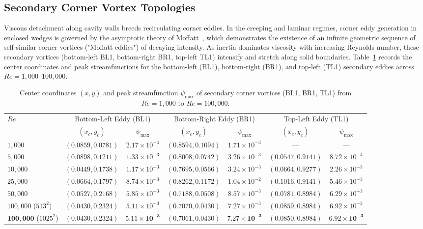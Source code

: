 \documentclass[11pt,a4paper]{article}
\begin{document}
\subsection{Secondary Corner Vortex Topologies}
Viscous detachment along cavity walls breeds recirculating corner eddies. In the creeping and laminar regimes, corner eddy generation in enclosed wedges is governed by the asymptotic theory of Moffatt~\cite{moffatt1964viscous}, which demonstrates the existence of an infinite geometric sequence of self-similar corner vortices ("Moffatt eddies") of decaying intensity. As inertia dominates viscosity with increasing Reynolds number, these secondary vortices (bottom-left BL1, bottom-right BR1, top-left TL1) intensify and stretch along solid boundaries. Table~\ref{tab:corner_vortices} records the center coordinates and peak streamfunctions for the bottom-left (BL1), bottom-right (BR1), and top-left (TL1) secondary eddies across $Re = 1{,}000\text{--}100{,}000$.

\begin{table}[htbp]
\centering
\scriptsize
\setlength{\tabcolsep}{2.5pt}
\caption{Center coordinates $(x, y)$ and peak streamfunction $\psi_{\max}$ of secondary corner vortices (BL1, BR1, TL1) from $Re = 1,000$ to $Re = 100,000$.}
\label{tab:corner_vortices}
\begin{tabular*}{\textwidth}{@{\extracolsep{\fill}}lcccccc@{}}
\toprule
$Re$ & \multicolumn{2}{c}{Bottom-Left Eddy (BL1)} & \multicolumn{2}{c}{Bottom-Right Eddy (BR1)} & \multicolumn{2}{c}{Top-Left Eddy (TL1)} \\
\cmidrule(lr){2-3} \cmidrule(lr){4-5} \cmidrule(lr){6-7}
 & $(x_c, y_c)$ & $\psi_{\max}$ & $(x_c, y_c)$ & $\psi_{\max}$ & $(x_c, y_c)$ & $\psi_{\max}$ \\
\midrule
$1,000$   & $(0.0859, 0.0781)$ & $2.17 \times 10^{-4}$ & $(0.8594, 0.1094)$ & $1.71 \times 10^{-3}$ & --- & --- \\
$5,000$   & $(0.0898, 0.1211)$ & $1.33 \times 10^{-3}$ & $(0.8008, 0.0742)$ & $3.26 \times 10^{-3}$ & $(0.0547, 0.9141)$ & $8.72 \times 10^{-4}$ \\
$10,000$  & $(0.0449, 0.1738)$ & $1.17 \times 10^{-3}$ & $(0.7695, 0.0566)$ & $3.24 \times 10^{-3}$ & $(0.0664, 0.9277)$ & $2.26 \times 10^{-3}$ \\
$25,000$  & $(0.0664, 0.1797)$ & $8.74 \times 10^{-3}$ & $(0.8262, 0.1172)$ & $1.04 \times 10^{-2}$ & $(0.1016, 0.9141)$ & $5.46 \times 10^{-3}$ \\
$50,000$  & $(0.0527, 0.2168)$ & $5.85 \times 10^{-3}$ & $(0.7188, 0.0508)$ & $8.57 \times 10^{-3}$ & $(0.0781, 0.8984)$ & $6.29 \times 10^{-3}$ \\
$100,000$ ($513^2$)  & $(0.0430, 0.2324)$ & $5.11 \times 10^{-3}$ & $(0.7070, 0.0430)$ & $7.27 \times 10^{-3}$ & $(0.0859, 0.8984)$ & $6.92 \times 10^{-3}$ \\
$\mathbf{100,000}$ ($1025^2$) & $\mathbf{(0.0430, 0.2324)}$ & $\mathbf{5.11 \times 10^{-3}}$ & $\mathbf{(0.7061, 0.0430)}$ & $\mathbf{7.27 \times 10^{-3}}$ & $\mathbf{(0.0850, 0.8984)}$ & $\mathbf{6.92 \times 10^{-3}}$ \\
\bottomrule
\end{tabular*}
\end{table}
\end{document}
